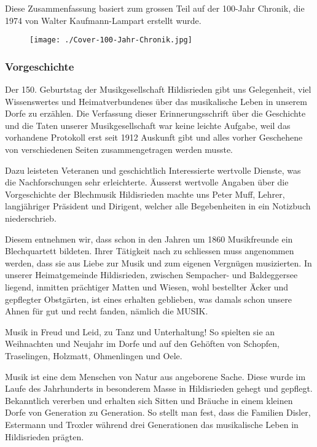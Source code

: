 
\noindent Diese Zusammenfassung basiert zum grossen Teil auf der 100-Jahr Chronik, die
1974 von Walter Kaufmann-Lampart erstellt wurde.

\begin{figure}[ht]
    \texttt{[image: ./Cover-100-Jahr-Chronik.jpg]}
\end{figure}



\subsubsection*{Vorgeschichte}

\begin{history}

    Der 150. Geburtstag der Musikgesellschaft Hildisrieden gibt uns Gelegenheit,
    viel Wissenswertes und Heimatverbundenes über das musikalische Leben in
    unserem Dorfe zu erzählen. Die Verfassung dieser Erinnerungsschrift über die
    Geschichte und die Taten unserer Musikgesellschaft war keine leichte
    Aufgabe, weil das vorhandene Protokoll erst seit 1912 Auskunft gibt und
    alles vorher Geschehene von verschiedenen Seiten zusammengetragen werden
    musste.

    Dazu leisteten Veteranen und geschichtlich Interessierte wertvolle Dienste,
    was die Nachforschungen sehr erleichterte. Äusserst wertvolle Angaben über
    die Vorgeschichte der Blechmusik Hildisrieden machte uns Peter Muff, Lehrer,
    langjähriger Präsident und Dirigent, welcher alle Begebenheiten in ein
    Notizbuch niederschrieb.

    Diesem entnehmen wir, dass schon in den Jahren um 1860 Musikfreunde ein
    Blechquartett bildeten. Ihrer Tätigkeit nach zu schliessen muss angenommen
    werden, dass sie aus Liebe zur Musik und zum eigenen Vergnügen musizierten.
    In unserer Heimatgemeinde Hildisrieden, zwischen Sempacher- und Baldeggersee
    liegend, inmitten prächtiger Matten und Wiesen, wohl bestellter Äcker und
    gepflegter Obstgärten, ist eines erhalten geblieben, was damals schon unsere
    Ahnen für gut und recht fanden, nämlich die MUSIK.

    Musik in Freud und Leid, zu Tanz und Unterhaltung! So spielten sie an
    Weihnachten und Neujahr im Dorfe und auf den Gehöften von Schopfen,
    Traselingen, Holzmatt, Ohmenlingen und Oele.

    Musik ist eine dem Menschen von Natur aus angeborene Sache. Diese wurde im
    Laufe des Jahrhunderts in besonderem Masse in Hildisrieden gehegt und
    gepflegt. Bekanntlich vererben und erhalten sich Sitten und Bräuche in einem
    kleinen Dorfe von Generation zu Generation. So stellt man fest, dass die
    Familien Disler, Estermann und Troxler während drei Generationen das
    musikalische Leben in Hildisrieden prägten.

\end{history}

